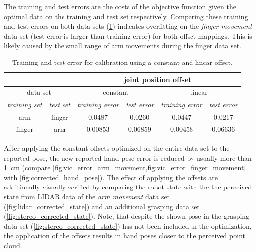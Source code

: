 The training and test errors are the costs of the objective function given the optimal data on the training and test set respectively. Comparing these training and test errors on both data sets (\cref{tab:offset_training_test_error}) indicates overfitting on the \textit{finger movement} data set (test error is larger than training error) for both offset mappings. This is likely caused by the small range of arm movements during the finger data set.


\begin{table}
\centering
\begin{tabular}{|c|c||c|c||c|c|}
\hline
\multicolumn{2}{|c||}{} & \multicolumn{4}{c|}{joint position offset} \\
\hline
\multicolumn{2}{|c||}{data set}  & \multicolumn{2}{c||}{constant} & \multicolumn{2}{c|}{linear} \\
\hline
\textit{training set} & \textit{test set} & \textit{training error} & \textit{test error} & \textit{training error} & \textit{test error} \\
\hline
arm & finger & 0.0487 & 0.0260 & 0.0447 & 0.0217 \\
\hline
finger & arm & 0.00853 & 0.06859 & 0.00458 & 0.06636 \\
\hline
\end{tabular}
\caption[Calibration error comparison]{Training and test error for calibration using a constant and linear offset.}
\label{tab:offset_training_test_error}
\end{table}

After applying the constant offsets optimized on the entire data set to the reported pose, the new reported hand pose error is reduced by usually more than \SI{1}{\cm} (compare \cref{fig:vic_error_arm_movement,fig:vic_error_finger_movement} with \cref{fig:corrected_hand_pose}). The effect of applying the offsets are additionally visually verified by comparing the robot state with the the perceived state from LIDAR data of the \textit{arm movement} data set (\cref{fig:lidar_corrected_state}) and an additional grasping data set (\cref{fig:stereo_corrected_state}). Note, that despite the shown pose in the grasping data set (\cref{fig:stereo_corrected_state}) has not been included in the optimization, the application of the offsets results in hand poses closer to the perceived point cloud.

